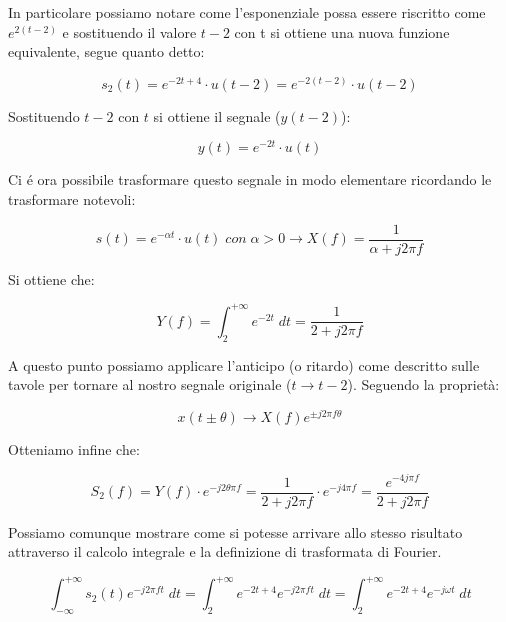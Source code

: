 \documentclass[../main.tex]{subfiles}
\begin{document}
In particolare possiamo notare come l'esponenziale possa essere riscritto come $e^{2(t-2)}$ e sostituendo il valore $t-2$ con t si ottiene una nuova funzione equivalente, segue quanto detto:

\begin{equation}
	s_2(t) = e^{-2t + 4} \cdot u(t-2) = e^{-2(t-2)} \cdot u(t-2)
\end{equation}

Sostituendo $t-2$ con $t$ si ottiene il segnale ($y(t-2)$):

\begin{equation}
	y(t) = e^{-2t} \cdot u(t)
\end{equation}

Ci é ora possibile trasformare questo segnale in modo elementare ricordando le trasformare notevoli:

\begin{equation}
	s(t) = e^{-\alpha t} \cdot u(t) \unit{\;con\;} \alpha > 0 \longrightarrow X(f) = \frac{1}{\alpha + j2\pi f}
\end{equation}

Si ottiene che:

\begin{equation}
	Y(f) = \int_{2}^{+\infty} e^{-2t} \;dt = \frac{1}{2 + j2\pi f}
\end{equation}

A questo punto possiamo applicare l'anticipo (o ritardo) come descritto sulle tavole per tornare al nostro segnale originale ($t \rightarrow t - 2$).
Seguendo la proprietà:

\begin{equation}
	x(t \pm \theta) \longrightarrow X(f) e^{\pm j 2\pi f \theta}
\end{equation}

Otteniamo infine che:

\begin{equation}
	S_2(f) = Y(f) \cdot e^{-j 2 \theta \pi f} = \frac{1}{2 + j 2\pi f } \cdot e^{-j 4 \pi f} = \frac{e^{-4j\pi f}}{2 + j2 \pi f}
\end{equation}

Possiamo comunque mostrare come si potesse arrivare allo stesso risultato attraverso il calcolo integrale e la definizione di trasformata di Fourier.

\begin{equation}
	\int_{-\infty}^{+\infty} s_2(t) e^{-j2\pi ft} \;dt = \int_{2}^{+\infty} e^{-2t+4} e^{-j2\pi ft} \;dt =  \int_{2}^{+\infty} e^{-2t+4} e^{-j \omega t} \;dt
\end{equation}
\end{document}
